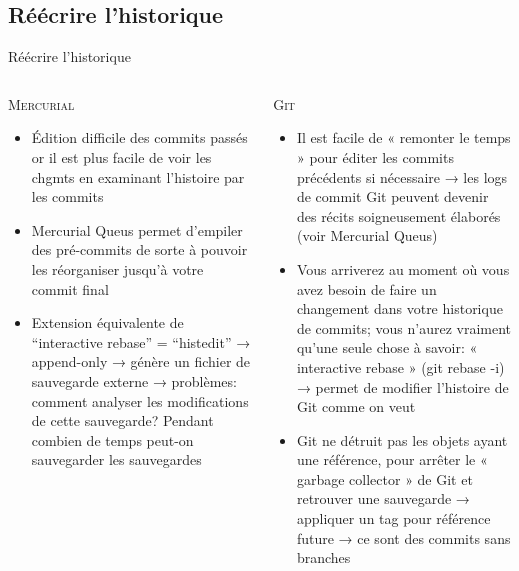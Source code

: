 \subsection{Réécrire l'historique}
\begin{frame}{Réécrire l'historique}
  \begin{columns}[T]

    \begin{column}{.5\textwidth}
     \textsc{Mercurial}

      \begin{itemize}
        \item{Édition difficile des commits passés or il est plus facile de
              voir les chgmts en examinant l’histoire par les commits}
        \item{Mercurial Queus permet d’empiler des pré-commits de sorte à
              pouvoir les réorganiser jusqu’à votre commit final}
        \item{Extension  équivalente de “interactive rebase” = “histedit” →
              append-only → génère un fichier de sauvegarde externe →
              problèmes: comment analyser les modifications de cette
              sauvegarde? Pendant combien de temps peut-on sauvegarder les
              sauvegardes}
      \end{itemize}
    \end{column}

    \begin{column}{.5\textwidth}
      \textsc{Git}

      \begin{itemize}
        \item{Il est facile de « remonter le temps » pour éditer les commits
              précédents si nécessaire → les logs de commit Git peuvent devenir
              des récits soigneusement élaborés (voir Mercurial Queus)}
        \item{Vous arriverez au moment où vous avez besoin de faire un
              changement dans votre historique de commits; vous n’aurez
              vraiment qu’une seule chose à savoir: « interactive rebase »
              (git rebase -i) → permet de modifier l’histoire de Git comme on
              veut}
        \item{Git ne détruit pas les objets ayant une référence, pour arrêter
              le « garbage collector » de Git et retrouver une sauvegarde →
              appliquer un tag pour référence future → ce sont des commits sans
              branches}
      \end{itemize}
    \end{column}

  \end{columns}
\end{frame}

